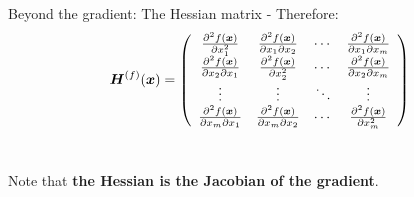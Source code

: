 \begin{frame}[t,allowframebreaks]{
    Beyond the gradient: The Hessian matrix -}
    Therefore:\\
    \vspace{-0.2cm}
    \begin{equation}
        \boldsymbol{H}^{(f)}(\boldsymbol{x}) = 
        \left(
            \begin{array}{cccc}
                \frac{\partial^2 f(\boldsymbol{x})}{\partial x_1^2} & 
                \frac{\partial^2 f(\boldsymbol{x})}{\partial x_1 \partial x_2} &
                \cdots & 
                \frac{\partial^2 f(\boldsymbol{x})}{\partial x_1 \partial x_m} \\ 
                \frac{\partial^2 f(\boldsymbol{x})}{\partial x_2 \partial x_1} & 
                \frac{\partial^2 f(\boldsymbol{x})}{\partial x_2^2} &
                \cdots & 
                \frac{\partial^2 f(\boldsymbol{x})}{\partial x_2 \partial x_m} \\ 
                \vdots &
                \vdots &
                \ddots & 
                \vdots \\
                \frac{\partial^2 f(\boldsymbol{x})}{\partial x_m \partial x_1} & 
                \frac{\partial^2 f(\boldsymbol{x})}{\partial x_m \partial x_2} & 
                \cdots & 
                \frac{\partial^2 f(\boldsymbol{x})}{\partial x_m^2} \\ 
            \end{array}
        \right)
        \label{eq:hessian_2}
    \end{equation}\\
    
    \vspace{0.25cm}

    Note that {\bf the \gls{Hessian} is the \gls{Jacobian} of the gradient}.


\end{frame}
